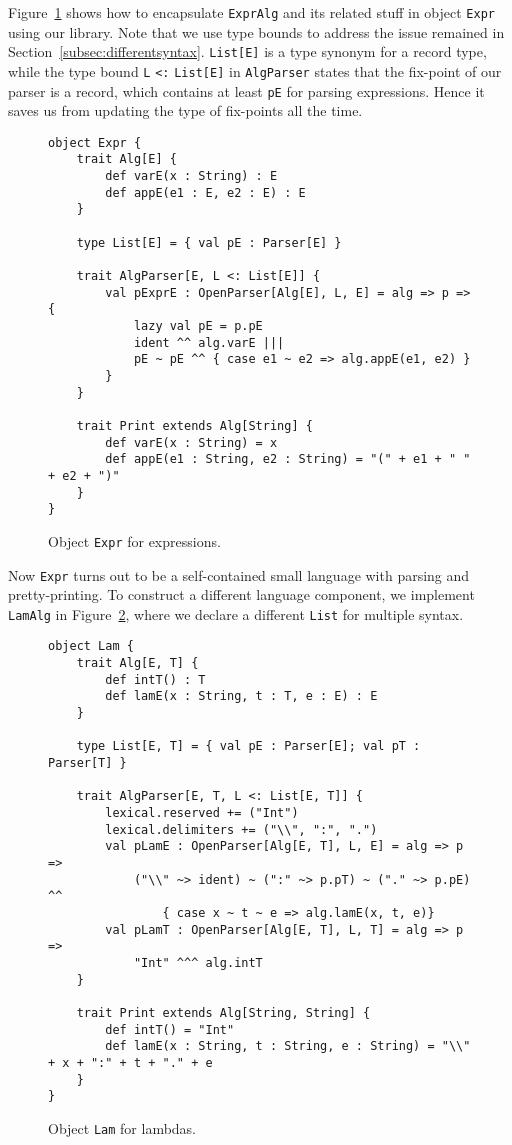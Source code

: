 Figure~\ref{fig:objectexpr} shows how to encapsulate \lstinline{ExprAlg} and its related stuff in object \lstinline{Expr} using our library. Note that we use type bounds to address the issue remained in Section~\ref{subsec:differentsyntax}. \lstinline{List[E]} is a type synonym for a record type, while the type bound \lstinline{L} \lstinline{<:} \lstinline{List[E]} in \lstinline{AlgParser} states that the fix-point of our parser is a record, which contains at least \lstinline{pE} for parsing expressions. Hence it saves us from updating the type of fix-points all the time.

\begin{figure}[htbp]
\centering
\begin{lstlisting}
object Expr {
    trait Alg[E] {
        def varE(x : String) : E
        def appE(e1 : E, e2 : E) : E
    }

    type List[E] = { val pE : Parser[E] }

    trait AlgParser[E, L <: List[E]] {
        val pExprE : OpenParser[Alg[E], L, E] = alg => p => {
            lazy val pE = p.pE
            ident ^^ alg.varE |||
            pE ~ pE ^^ { case e1 ~ e2 => alg.appE(e1, e2) }
        }
    }

    trait Print extends Alg[String] {
        def varE(x : String) = x
        def appE(e1 : String, e2 : String) = "(" + e1 + " " + e2 + ")"
    }
}
\end{lstlisting}
\caption{Object \lstinline{Expr} for expressions.}\label{fig:objectexpr}
\end{figure}

Now \lstinline{Expr} turns out to be a self-contained small language with parsing and pretty-printing. To construct a different language component, we implement \lstinline{LamAlg} in Figure~\ref{fig:objectlam}, where we declare a different \lstinline{List} for multiple syntax.

\begin{figure}[htbp]
\centering
\begin{lstlisting}
object Lam {
    trait Alg[E, T] {
        def intT() : T
        def lamE(x : String, t : T, e : E) : E
    }

    type List[E, T] = { val pE : Parser[E]; val pT : Parser[T] }

    trait AlgParser[E, T, L <: List[E, T]] {
        lexical.reserved += ("Int")
        lexical.delimiters += ("\\", ":", ".")
        val pLamE : OpenParser[Alg[E, T], L, E] = alg => p =>
            ("\\" ~> ident) ~ (":" ~> p.pT) ~ ("." ~> p.pE) ^^
                { case x ~ t ~ e => alg.lamE(x, t, e)}
        val pLamT : OpenParser[Alg[E, T], L, T] = alg => p =>
            "Int" ^^^ alg.intT
    }

    trait Print extends Alg[String, String] {
        def intT() = "Int"
        def lamE(x : String, t : String, e : String) = "\\" + x + ":" + t + "." + e
    }
}
\end{lstlisting}
\caption{Object \lstinline{Lam} for lambdas.}\label{fig:objectlam}
\end{figure}

